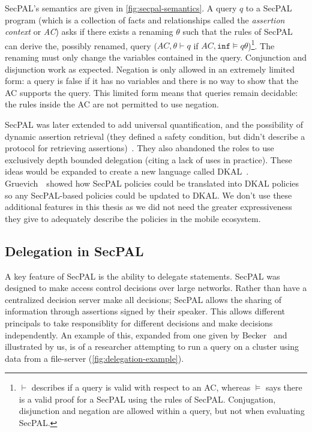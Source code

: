 \documentclass[thesis.tex]{subfiles}
\begin{document}
SecPAL's semantics are given in \autoref{fig:secpal-semantics}.  A
query $q$ to a SecPAL program (which is a collection of facts and
relationships called the \emph{assertion context} or \emph{AC}) asks
if there exists a renaming $\theta$ such that the rules of SecPAL can
derive the, possibly renamed, query ($AC,\theta \vdash q$
if $AC,\texttt{inf} \models q\theta$)\footnote{$\vdash$ describes if a query
  is valid with respect to an AC, whereas $\models$ says there is a
  valid proof for a SecPAL using the rules of SecPAL.  Conjugation,
  disjunction and negation are allowed within a query, but not when
  evaluating SecPAL.}.  The renaming must only change 
the variables contained in the query. Conjunction and disjunction work
as expected.  Negation is only allowed in an extremely limited form: a
query is false if it has no variables and there is no way
to show that the AC supports the query.  This limited form means that
queries remain decidable: the rules inside the AC are not permitted to
use negation.

SecPAL was later extended to add universal quantification, and the possibility
of dynamic assertion retrieval (they defined a safety condition, but didn't
describe a protocol for retrieving
assertions)~\cite{moritz_y_becker_secpal:_2009}. They also abandoned the roles
to use exclusively depth bounded delegation (citing a lack of uses in practice).
These ideas would be expanded to create a new language called
DKAL~\cite{gurevich_dkal:_2008}. Gruevich~\etal~showed how SecPAL policies could
be translated into DKAL policies~\cite{gurevich_dkal:_2008} so any SecPAL-based
policies could be updated to DKAL. We don't use these additional features in
this thesis as we did not need the greater expressiveness they give to
adequately describe the policies in the mobile ecosystem.

\subsection{Delegation in SecPAL}

A key feature of SecPAL is the ability to delegate statements. SecPAL was
designed to make access control decisions over large networks. Rather than have
a centralized decision server make all decisions; SecPAL allows
the sharing of information through assertions signed by their speaker. This allows
different principals to take responsiblity for different decisions and make
decisions independently. An example of this, expanded from one given by
Becker~\cite{becker_secpal:_2006} and illustrated by us, is of a
researcher attempting to run a query on a cluster using data from a file-server
(\autoref{fig:delegation-example}).
\end{document}
